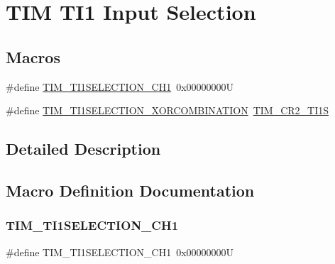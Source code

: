 \hypertarget{group___t_i_m___t_i1___selection}{}\section{T\+IM T\+I1 Input Selection}
\label{group___t_i_m___t_i1___selection}
\subsection*{Macros}
\begin{DoxyCompactItemize}
\item 
\#define \hyperlink{group___t_i_m___t_i1___selection_gace6563bccf7635461f660fbed6241488}{T\+I\+M\+\_\+\+T\+I1\+S\+E\+L\+E\+C\+T\+I\+O\+N\+\_\+\+C\+H1}~0x00000000U
\item 
\#define \hyperlink{group___t_i_m___t_i1___selection_ga40dfcb0e3f2fdf0f45cbba227106310a}{T\+I\+M\+\_\+\+T\+I1\+S\+E\+L\+E\+C\+T\+I\+O\+N\+\_\+\+X\+O\+R\+C\+O\+M\+B\+I\+N\+A\+T\+I\+ON}~\hyperlink{group___peripheral___registers___bits___definition_gad07504497b70af628fa1aee8fe7ef63c}{T\+I\+M\+\_\+\+C\+R2\+\_\+\+T\+I1S}
\end{DoxyCompactItemize}


\subsection{Detailed Description}


\subsection{Macro Definition Documentation}
\mbox{\label{group___t_i_m___t_i1___selection_gace6563bccf7635461f660fbed6241488}} 
\subsubsection{\texorpdfstring{T\+I\+M\+\_\+\+T\+I1\+S\+E\+L\+E\+C\+T\+I\+O\+N\+\_\+\+C\+H1}{TIM\_TI1SELECTION\_CH1}}
{\footnotesize\ttfamily \#define T\+I\+M\+\_\+\+T\+I1\+S\+E\+L\+E\+C\+T\+I\+O\+N\+\_\+\+C\+H1~0x00000000U}

